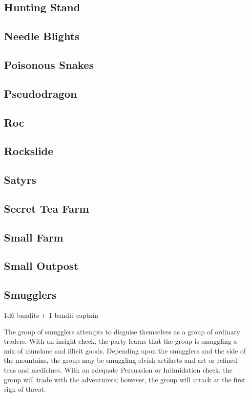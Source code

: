 \subsection{Hunting Stand}

\subsection{Needle Blights}

\subsection{Poisonous Snakes}

\subsection{Pseudodragon}

\subsection{Roc}

\subsection{Rockslide}

\subsection{Satyrs}

\subsection{Secret Tea Farm}

\subsection{Small Farm}

\subsection{Small Outpost}

\subsection{Smugglers}

1d6 bandits + 1 bandit captain

The group of smugglers attempts to disguise themselves as a group of ordinary traders.
With an insight check, the party learns that the group is smuggling a mix of mundane and illicit goods.
Depending upon the smugglers and the side of the mountains, the group may be smuggling elvish artifacts and art or refined teas and medicines.
With an adequate Persuasion or Intimidation check, the group will trade with the adventurers; however, the group will attack at the first sign of threat.

